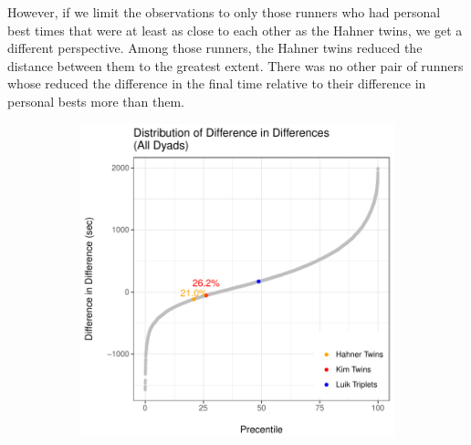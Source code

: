 \documentclass[12pt,titlepage]{article}
\begin{document}
However, if we limit the observations to only those runners who had personal best times that were at least as close to each other as the Hahner twins, we get a different perspective.  Among those runners,  the Hahner twins reduced the distance between them to the greatest extent.  There was no other pair of runners whose reduced the difference in the final time relative to their difference in personal bests more than them.         

\begin{figure}[!ht]
 \caption{How Hahner Twins Rank in Difference-in-Differences}
 \label{fig:diffdiff}
 \begin{subfigure}{.5\textwidth}
 \includegraphics[width=\textwidth, keepaspectratio]{diff_in_diff_1.pdf}
 \end{subfigure}
 \begin{subfigure}{.5\textwidth}

\end{subfigure}
\end{figure}
\end{document}
